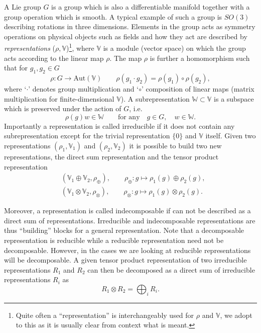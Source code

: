 A Lie group $G$ is a group which is also a differentiable manifold together with a group operation which is smooth. A typical example of such a group is $SO(3)$ describing rotations in three dimensions. Elements in the group acts as symmetry operations on physical objects such as fields and how they act are described by \emph{representations} ($\rho,\mathbb{V}$)\footnote{Quite often a ``representation'' is interchangeably used for $\rho$ and $\mathbb{V}$, we adopt to this as it is usually clear from context what is meant.}, where $\mathbb{V}$ is a module (vector space) on which the group acts according to the linear map $\rho$. The map $\rho$ is further a homomorphism such that for $g_1,g_2\in G$
\begin{equation}
    \rho : G\to \text{Aut}(\mathbb{V}) \qquad \rho(g_1\cdot g_2) = \rho(g_1)\circ\rho(g_2),
\end{equation}
where `$\cdot$' denotes group multiplication and `$\circ$' composition of linear maps (matrix multiplication for finite-dimensional $\mathbb{V}$). A subrepresentation $\mathbb{W}\subset\mathbb{V}$ is a subspace which is preserved under the action of $G$, i.e.\
\begin{equation}
    \rho(g)w \in \mathbb{W} \qquad \text{for any} \quad g\in G,\quad w\in\mathbb{W}.
\end{equation}
Importantly a representation is called irreducible if it does not contain any subrepresentation except for the trivial representation $\{0\}$ and $\mathbb{V}$ itself. Given two representations $(\rho_1,\mathbb{V}_1)$ and $(\rho_2,\mathbb{V}_2)$ it is possible to build two new representations, the direct sum representation and the tensor product representation
\begin{align}
    &(\mathbb{V}_1\oplus\mathbb{V}_2,\rho_{\oplus}),\qquad \rho_\oplus: g\mapsto \rho_1(g)\oplus\rho_2(g),\\
    &(\mathbb{V}_1\otimes\mathbb{V}_2,\rho_{\otimes}),\qquad \rho_\otimes: g\mapsto \rho_1(g)\otimes\rho_2(g).
\end{align}

Moreover, a representation is called indecomposable if can not be described as a direct sum of representations. Irreducible and indecomposable representations are thus ``building'' blocks for a general representation. Note that a decomposable representation is reducible while a reducible representation need not be decomposable. However, in the cases we are looking at reducible representations will be decomposable. A given tensor product representation of two irreducible representations $R_1$ and $R_2$ can then be decomposed as a direct sum of irreducible representations $R_i$ as
\begin{equation}
    R_1\otimes R_2 = \bigoplus_i R_i.
\end{equation}



